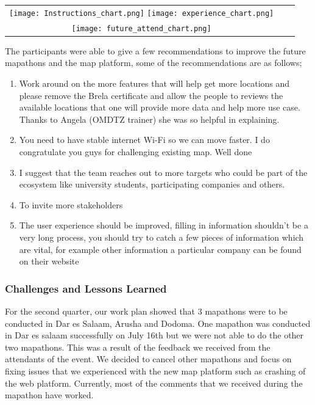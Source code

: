 \documentclass[a4paper,12pt,twoside]{article}
\begin{document}
\begin{tabular}{c|c|c}
	\texttt{[image: Instructions\_chart.png]} \texttt{[image: experience\_chart.png]}\\
	\texttt{[image: future\_attend\_chart.png]}\\
\end{tabular}

The participants were able to give a few recommendations to improve the future mapathons and the map platform, some of the recommendations are as follows;

\begin{enumerate}
	\item Work around on the more features that will help get more locations and please remove the Brela certificate and allow the people to reviews the available locations that one will provide more data and help more use case. Thanks to Angela (OMDTZ trainer) she was so helpful in explaining.
	\item You need to have stable internet Wi-Fi so we can move faster. I do congratulate you guys for challenging existing map. Well done
	\item I suggest that the team reaches out to more targets who could be part of the ecosystem like university students, participating companies and others.
	\item To invite more stakeholders
	\item The user experience should be improved, filling in information shouldn't be a very long process, you should try to catch a few pieces of information which are vital, for example other information a particular company can be found on their website
\end{enumerate}

\subsubsection{Challenges and Lessons Learned}
For the second quarter, our work plan showed that 3 mapathons were to be conducted in Dar es Salaam, Arusha and Dodoma. One mapathon was conducted in Dar es salaam successfully on July 16th but we were not able to do the other two mapathons. This was a result of the feedback we received from the attendants of the event. We decided to cancel other mapathons and focus on fixing issues that we experienced with the new map platform such as crashing of the web platform. Currently, most of the comments that we received during the mapathon have worked.
\end{document}
